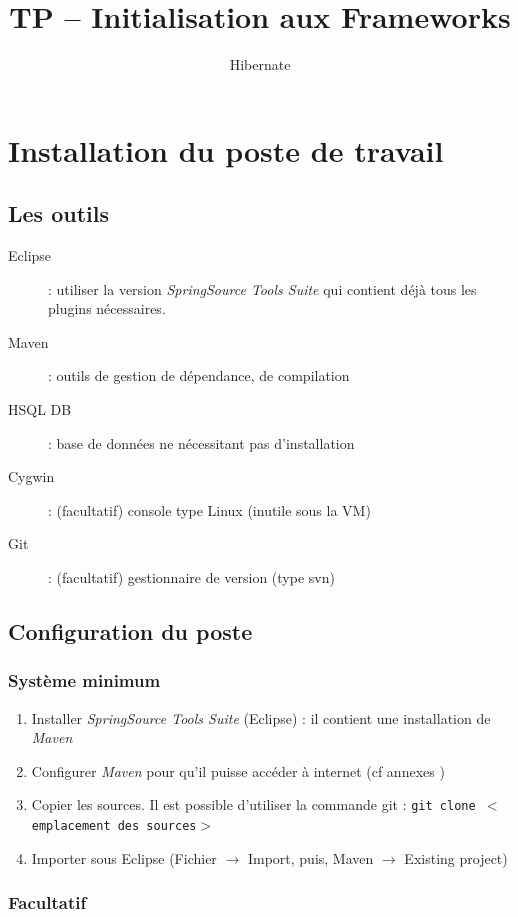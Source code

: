 \documentclass[small,algo]{dushClass} %
\title{TP -- Initialisation aux Frameworks}
\subtitle{Hibernate}
\begin{document}
\section{Installation du poste de travail}

\subsection{Les outils}
\begin{description}
\item[Eclipse] : utiliser la version \emph{SpringSource Tools Suite} qui contient déjà tous les plugins nécessaires.
\item[Maven] : outils de gestion de dépendance, de compilation
\item[HSQL DB] : base de données ne nécessitant pas d'installation
\item[Cygwin] : (facultatif) console type Linux (inutile sous la VM)
\item[Git] : (facultatif) gestionnaire de version (type svn)
\end{description}

\subsection{Configuration du poste}

\subsubsection{Système minimum}

\begin{enumerate}
\item Installer \emph{SpringSource Tools Suite} (Eclipse) : il contient une installation de \emph{Maven}
\item Configurer \emph{Maven} pour qu'il puisse accéder à internet (cf annexes )
\item Copier les sources. Il est possible d'utiliser la commande git : \texttt{git clone $<$emplacement des sources$>$ }
\item Importer sous Eclipse (Fichier $\rightarrow$ Import, puis, Maven $\rightarrow$ Existing project)
\end{enumerate}

\subsubsection{Facultatif}
\end{document}
